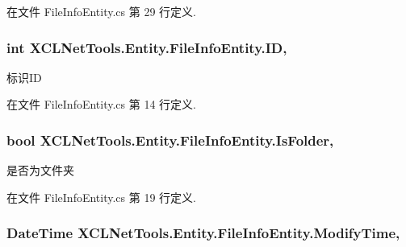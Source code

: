 在文件 File\-Info\-Entity.\-cs 第 29 行定义.

\hypertarget{class_x_c_l_net_tools_1_1_entity_1_1_file_info_entity_a150f26081f12badeea9a2255bbea6faf}{
\subsubsection[{I\-D}]{\setlength{\rightskip}{0pt plus 5cm}int X\-C\-L\-Net\-Tools.\-Entity.\-File\-Info\-Entity.\-I\-D\hspace{0.3cm}{\ttfamily [get]}, {\ttfamily [set]}}}\label{class_x_c_l_net_tools_1_1_entity_1_1_file_info_entity_a150f26081f12badeea9a2255bbea6faf}


标识\-I\-D 



在文件 File\-Info\-Entity.\-cs 第 14 行定义.

\hypertarget{class_x_c_l_net_tools_1_1_entity_1_1_file_info_entity_ad945716535742c01f83dffc2766c0987}{
\subsubsection[{Is\-Folder}]{\setlength{\rightskip}{0pt plus 5cm}bool X\-C\-L\-Net\-Tools.\-Entity.\-File\-Info\-Entity.\-Is\-Folder\hspace{0.3cm}{\ttfamily [get]}, {\ttfamily [set]}}}\label{class_x_c_l_net_tools_1_1_entity_1_1_file_info_entity_ad945716535742c01f83dffc2766c0987}


是否为文件夹 



在文件 File\-Info\-Entity.\-cs 第 19 行定义.

\hypertarget{class_x_c_l_net_tools_1_1_entity_1_1_file_info_entity_a64c6633bec7e4d547632c122dbaad9f8}{
\subsubsection[{Modify\-Time}]{\setlength{\rightskip}{0pt plus 5cm}Date\-Time X\-C\-L\-Net\-Tools.\-Entity.\-File\-Info\-Entity.\-Modify\-Time\hspace{0.3cm}{\ttfamily [get]}, {\ttfamily [set]}}}\label{class_x_c_l_net_tools_1_1_entity_1_1_file_info_entity_a64c6633bec7e4d547632c122dbaad9f8}


